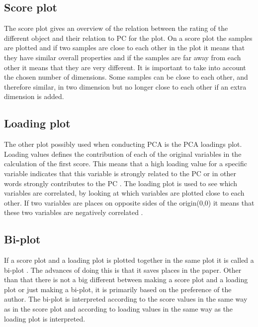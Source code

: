 \subsection*{Score plot}
The score plot gives an overview of the relation between the rating of the different object and their relation to PC for the plot. \blankline
%
%
On a score plot the samples are plotted and if two samples are close to each other in the plot it means that they have similar overall properties and if the samples are far away from each other it means that they are very different. It is important to take into account the chosen number of dimensions. Some samples can be close to each other, and therefore similar, in two dimension but no longer close to each other if an extra dimension is added. 
%
\subsection*{Loading plot}
The other plot possibly used when conducting PCA is the PCA loadings plot.
Loading values defines the contribution of each of the original variables in the calculation of the first score. This means that a high loading value for a specific variable indicates that this variable is strongly related to the PC or in other words strongly contributes to the PC \parencite[p. 212]{Naes2010}. \blankline
%
The loading plot is used to see which variables are correlated, by looking at which variables are plotted close to each other. If two variables are places on opposite sides of the origin(0,0) it means that these two variables are negatively correlated \parencite[p. 216]{Naes2010}.
%
\subsection*{Bi-plot}
If a score plot and a loading plot is plotted together in the same plot it is called a bi-plot  \parencite[p. 217]{Naes2010}. The advances of doing this is that it saves places in the paper. Other than that there is not a big different between making a score plot and a loading plot or just making a bi-plot, it is primarily based on the preference of the author. The bi-plot is interpreted according to the score values in the same way as in the score plot and according to loading values in the same way as the loading plot is interpreted. 
%
